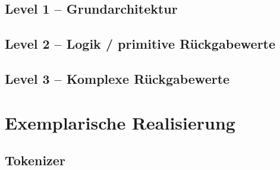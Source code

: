 
  \subsection{Level 1 -- Grundarchitektur}
  \label{ssec:Level 1 -- Grundarchitektur}
  \subsection{Level 2 -- Logik / primitive Rückgabewerte}
  \label{ssec:Level 2 -- Logik / primitive Rückgabewerte}

  \subsection{Level 3 -- Komplexe Rückgabewerte}
  \label{ssec:Level 3 -- Komplexe Rückgabewerte}

\section{Exemplarische Realisierung}
\label{sec:Exemplarische Realisierung}
  \subsection{Tokenizer}
  \label{ssec:Tokenizer}

